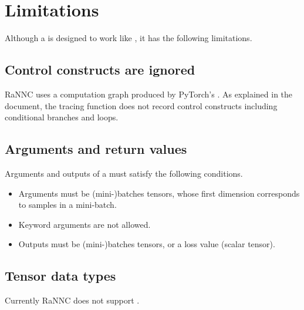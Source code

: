 \documentclass[letterpaper,10pt,english]{sphinxmanual}
\begin{document}
\chapter{Limitations}
\label{\detokenize{limitations:limitations}}\label{\detokenize{limitations::doc}}
Although a  is designed to work like , it has the following limitations.


\section{Control constructs are ignored}
\label{\detokenize{limitations:control-constructs-are-ignored}}
RaNNC uses a computation graph produced by PyTorch’s .
As explained in the document, the tracing function does not record control constructs including conditional branches and loops.


\section{Arguments and return values}
\label{\detokenize{limitations:arguments-and-return-values}}
Arguments and outputs of a  must satisfy the following conditions.
\begin{itemize}
\item {} 
Arguments must be (mini-)batches tensors, whose first dimension corresponds to samples in a mini-batch.

\item {} 
Keyword arguments are not allowed.

\item {} 
Outputs must be (mini-)batches tensors, or a loss value (scalar tensor).

\end{itemize}


\section{Tensor data types}
\label{\detokenize{limitations:tensor-data-types}}
Currently RaNNC does not support .
\end{document}
